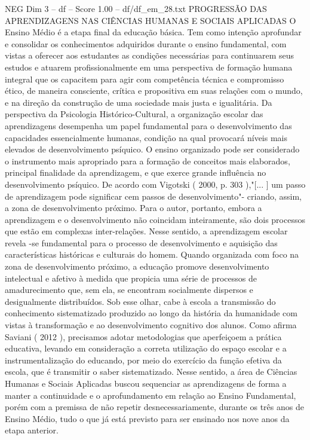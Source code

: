 \begin{textsample}{NEG Dim 3 – df – Score 1.00 – df/df\_em\_28.txt}  \label{ex:f3_neg_161}
PROGRESSÃO DAS APRENDIZAGENS NAS CIÊNCIAS HUMANAS E SOCIAIS APLICADAS O Ensino Médio é a etapa final da educação básica.
Tem como intenção aprofundar e consolidar os conhecimentos adquiridos durante o ensino fundamental, com vistas a oferecer aos estudantes as condições necessárias para continuarem seus estudos e atuarem profissionalmente em uma perspectiva de formação humana integral que os capacitem para agir com competência técnica e compromisso ético, de maneira consciente, crítica e propositiva em suas relações com o mundo, e na direção da construção de uma sociedade mais justa e igualitária.
Da perspectiva da Psicologia Histórico-Cultural, a organização escolar das aprendizagens desempenha um papel fundamental para o desenvolvimento das capacidades essencialmente humanas, condição na qual provocará níveis mais elevados de desenvolvimento psíquico.
O ensino organizado pode ser considerado o instrumento mais apropriado para a formação de conceitos mais elaborados, principal finalidade da aprendizagem, e que exerce grande influência no desenvolvimento psíquico.
De acordo com Vigotski ( 2000, p. 303 ),"[... ] um passo de aprendizagem pode significar cem passos de desenvolvimento"- criando, assim, a zona de desenvolvimento próximo.
Para o autor, portanto, embora a aprendizagem e o desenvolvimento não coincidam inteiramente, são dois processos que estão em complexas inter-relações.
Nesse sentido, a aprendizagem escolar revela -se fundamental para o processo de desenvolvimento e aquisição das características históricas e culturais do homem.
Quando organizada com foco na zona de desenvolvimento próximo, a educação promove desenvolvimento intelectual e afetivo à medida que propicia uma série de processos de amadurecimento que, sem ela, se encontram socialmente dispersos e desigualmente distribuídos.
Sob esse olhar, cabe à escola a transmissão do conhecimento sistematizado produzido ao longo da história da humanidade com vistas à transformação e ao desenvolvimento cognitivo dos alunos.
Como afirma Saviani ( 2012 ), precisamos adotar metodologias que aperfeiçoem a prática educativa, levando em consideração a correta utilização do espaço escolar e a instrumentalização do educando, por meio do exercício da função efetiva da escola, que é transmitir o saber sistematizado.
Nesse sentido, a área de Ciências Humanas e Sociais Aplicadas buscou sequenciar as aprendizagens de forma a manter a continuidade e o aprofundamento em relação ao Ensino Fundamental, porém com a premissa de não repetir desnecessariamente, durante os três anos de Ensino Médio, tudo o que já está previsto para ser ensinado nos nove anos da etapa anterior.

\end{textsample}
